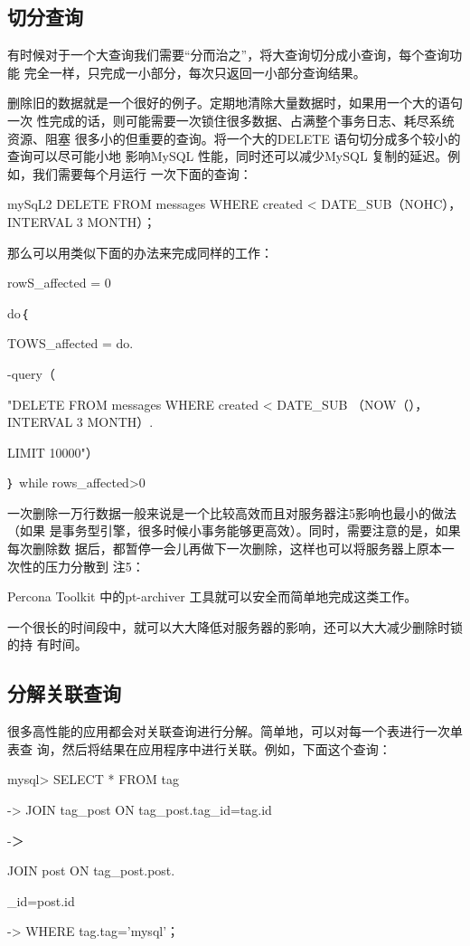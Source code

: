 \subsection{切分查询}
有时候对于一个大查询我们需要“分而治之”，将大查询切分成小查询，每个查询功能
完全一样，只完成一小部分，每次只返回一小部分查询结果。

删除旧的数据就是一个很好的例子。定期地清除大量数据时，如果用一个大的语句一次
性完成的话，则可能需要一次锁住很多数据、占满整个事务日志、耗尽系统资源、阻塞
很多小的但重要的查询。将一个大的DELETE 语句切分成多个较小的查询可以尽可能小地
影响MySQL 性能，同时还可以减少MySQL 复制的延迟。例如，我们需要每个月运行
一次下面的查询：

mySqL2 DELETE FROM messages WHERE created < DATE\_SUB（NOHC）， INTERVAL 3 MONTH）；

那么可以用类似下面的办法来完成同样的工作：

rowS\_affected = 0

do｛

TOWS\_affected = do.

-query（

"DELETE FROM messages WHERE created < DATE\_SUB （NOW（）， INTERVAL 3 MONTH）.

LIMIT 10000"）

｝ while rows\_affected>0

一次删除一万行数据一般来说是一个比较高效而且对服务器注5影响也最小的做法（如果
是事务型引擎，很多时候小事务能够更高效）。同时，需要注意的是，如果每次删除数
据后，都暂停一会儿再做下一次删除，这样也可以将服务器上原本一次性的压力分散到
注5：

Percona Toolkit 中的pt-archiver 工具就可以安全而简单地完成这类工作。

一个很长的时间段中，就可以大大降低对服务器的影响，还可以大大减少删除时锁的持
有时间。

\subsection{分解关联查询}
很多高性能的应用都会对关联查询进行分解。简单地，可以对每一个表进行一次单表查
询，然后将结果在应用程序中进行关联。例如，下面这个查询：

mysql> SELECT * FROM tag

-> JOIN tag\_post ON tag\_post.tag\_id=tag.id

-＞

JOIN post ON tag\_post.post.

\_id=post.id

-> WHERE tag.tag='mysql'；

